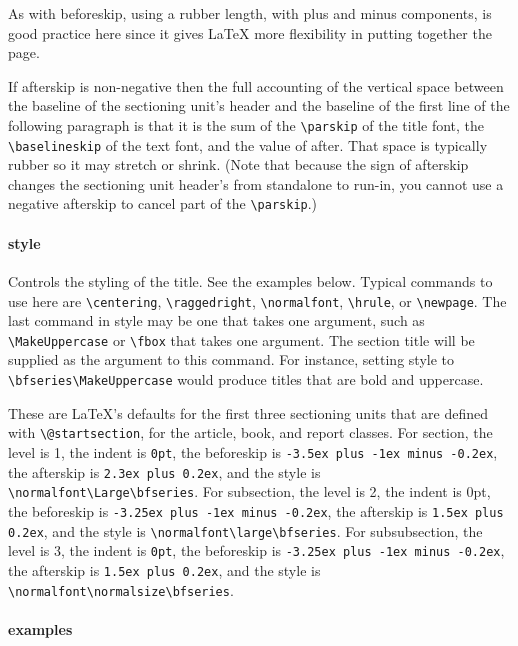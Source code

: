 As with beforeskip, using a rubber length, with plus and minus components,
is good practice here since it gives LaTeX more flexibility in putting
together the page.

If afterskip is non-negative then the full accounting of the vertical space
between the baseline of the sectioning unit’s header and the baseline of
the first line of the following paragraph is that it is the sum of the
\verb|\parskip| of the title font, the \verb|\baselineskip| of the text font, and the
value of after. That space is typically rubber so it may stretch or shrink.
(Note that because the sign of afterskip changes the sectioning unit
header’s from standalone to run-in, you cannot use a negative afterskip to
cancel part of the \verb|\parskip|.) 

\paragraph{style}

Controls the styling of the title. See the examples below. Typical commands to
use here are \verb|\centering|, \verb|\raggedright|, \verb|\normalfont|,
\verb|\hrule|, or \verb|\newpage|. The last command in style may be one that
takes one argument, such as \verb|\MakeUppercase| or \verb|\fbox| that takes one argument.
The section title will be supplied as the argument to this command. For
instance, setting style to \verb|\bfseries\MakeUppercase| would produce titles that
are bold and uppercase. 

These are LaTeX’s defaults for the first three sectioning units that are
defined with \verb|\@startsection|, for the article, book, and report classes. For
section, the level is 1, the indent is \verb|0pt|, the beforeskip is 
\verb|-3.5ex plus -1ex minus -0.2ex|, the afterskip is \verb|2.3ex plus 0.2ex|, and the style is
\verb|\normalfont\Large\bfseries|. For subsection, the level is 2, the indent is 0pt,
the beforeskip is \verb|-3.25ex plus -1ex minus -0.2ex|, the afterskip is 
\verb|1.5ex plus 0.2ex|, and the style is \verb|\normalfont\large\bfseries|. For subsubsection, the
level is 3, the indent is \verb|0pt|, the beforeskip is 
\verb|-3.25ex plus -1ex minus -0.2ex|, the afterskip is \verb|1.5ex plus 0.2ex|, and the style is
\verb|\normalfont\normalsize\bfseries|.

\paragraph{examples}

